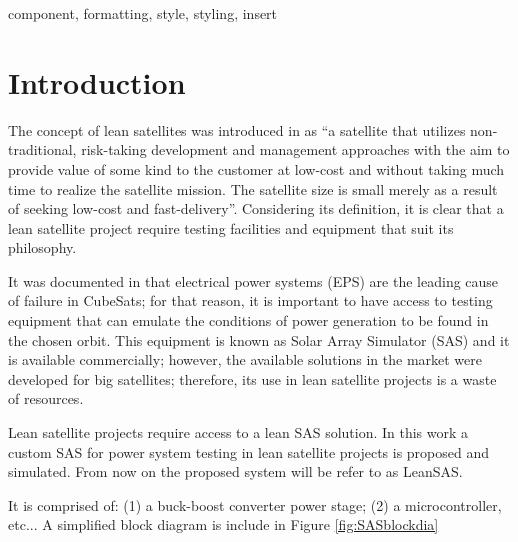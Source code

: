 \documentclass[conference]{IEEEtran}
\begin{document}
\begin{abstract}
This document is a model and instructions for \LaTeX.
This and the IEEEtran.cls file define the components of your paper [title, text, heads, etc.]. *CRITICAL: Do Not Use Symbols, Special Characters, Footnotes, 
or Math in Paper Title or Abstract.
\end{abstract}

\begin{IEEEkeywords}
component, formatting, style, styling, insert
\end{IEEEkeywords}

\section{Introduction}
The concept of lean satellites was introduced in \cite{leansat} as ``a satellite that utilizes non-traditional, risk-taking development and management approaches with the aim to provide value of some kind to the customer at low-cost and without taking much time to realize the satellite mission. The satellite size is small merely as a result of seeking low-cost and fast-delivery''. Considering its definition, it is clear that a lean satellite project require testing facilities and equipment that suit its philosophy. 

It was documented in \cite{reliability} that electrical power systems (EPS) are the leading cause of failure in CubeSats; for that reason, it is important to have access to testing equipment that can emulate the conditions of power generation to be found in the chosen orbit. This equipment is known as Solar Array Simulator (SAS) and it is available commercially; however, the available solutions in the market were developed for big satellites; therefore, its use in lean satellite projects is a waste of resources.

Lean satellite projects require access to a lean SAS solution. In this work a custom SAS for power system testing in lean satellite projects is proposed and simulated. From now on the proposed system will be refer to as LeanSAS.

It is comprised of: (1) a buck-boost converter power stage; (2) a microcontroller, etc... A simplified block diagram is include in Figure \ref{fig:SASblockdia}
\end{document}
